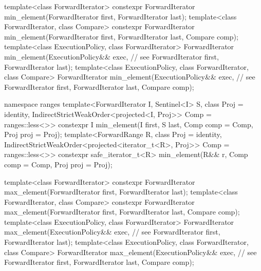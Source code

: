 \begin{codeblock}
  template<class ForwardIterator>
    constexpr ForwardIterator min_element(ForwardIterator first, ForwardIterator last);
  template<class ForwardIterator, class Compare>
    constexpr ForwardIterator min_element(ForwardIterator first, ForwardIterator last,
                                          Compare comp);
  template<class ExecutionPolicy, class ForwardIterator>
    ForwardIterator min_element(ExecutionPolicy&& exec, // see 
                                ForwardIterator first, ForwardIterator last);
  template<class ExecutionPolicy, class ForwardIterator, class Compare>
    ForwardIterator min_element(ExecutionPolicy&& exec, // see 
                                ForwardIterator first, ForwardIterator last,
                                Compare comp);
\end{codeblock}\begin{addedblock}\begin{codeblock}
  namespace ranges {
    template<ForwardIterator I, Sentinel<I> S, class Proj = identity,
        IndirectStrictWeakOrder<projected<I, Proj>> Comp = ranges::less<>>
      constexpr I min_element(I first, S last, Comp comp = Comp{}, Proj proj = Proj{});
    template<ForwardRange R, class Proj = identity,
        IndirectStrictWeakOrder<projected<iterator_t<R>, Proj>> Comp = ranges::less<>>
      constexpr safe_iterator_t<R>
        min_element(R&& r, Comp comp = Comp{}, Proj proj = Proj{});
  }
\end{codeblock}\end{addedblock}\begin{codeblock}
  template<class ForwardIterator>
    constexpr ForwardIterator max_element(ForwardIterator first, ForwardIterator last);
  template<class ForwardIterator, class Compare>
    constexpr ForwardIterator max_element(ForwardIterator first, ForwardIterator last,
                                          Compare comp);
  template<class ExecutionPolicy, class ForwardIterator>
    ForwardIterator max_element(ExecutionPolicy&& exec, // see 
                                ForwardIterator first, ForwardIterator last);
  template<class ExecutionPolicy, class ForwardIterator, class Compare>
    ForwardIterator max_element(ExecutionPolicy&& exec, // see 
                                ForwardIterator first, ForwardIterator last,
                                Compare comp);
\end{codeblock}\begin{addedblock}\begin{codeblock}

\end{codeblock}
\end{addedblock}
